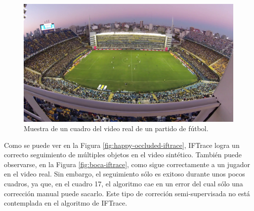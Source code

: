 \begin{figure}[H]
    \centering
    \includegraphics[width=\linewidth]{./images/sample_boca.png}
    \caption{Muestra de un cuadro del video real de un partido de fútbol.}
    \label{fig:sample-boca}
\end{figure}

Como se puede ver en la Figura \ref{fig:happy-occluded-iftrace}, IFTrace logra
un correcto seguimiento de múltiples objetos en el video sintético.  También
puede observarse, en la Figura \ref{fig:boca-iftrace}, como sigue correctamente
a un jugador en el video real.  Sin embargo, el seguimiento sólo es exitoso
durante unos pocos cuadros, ya que, en el cuadro 17, el algoritmo cae en un
error del cual sólo una corrección manual puede sacarlo. Este tipo de correción
semi-supervisada no está contemplada en el algoritmo de IFTrace.

